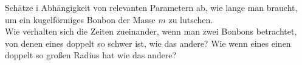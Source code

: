 \begin{Exercise}[label = Bonbon, origin = {4. Runde zur 48. IPhO 2017}, title = Bonbon, difficulty = 2]
Schätze i Abhängigkeit von relevanten Parametern ab, wie lange man braucht, um ein kugelförmiges Bonbon der Masse $m$ zu lutschen.\\
Wie verhalten sich die Zeiten zueinander, wenn man zwei Bonbons betrachtet, von denen eines doppelt so schwer ist, wie das andere? Wie wenn eines einen doppelt so großen Radius hat wie das andere?
\end{Exercise}
